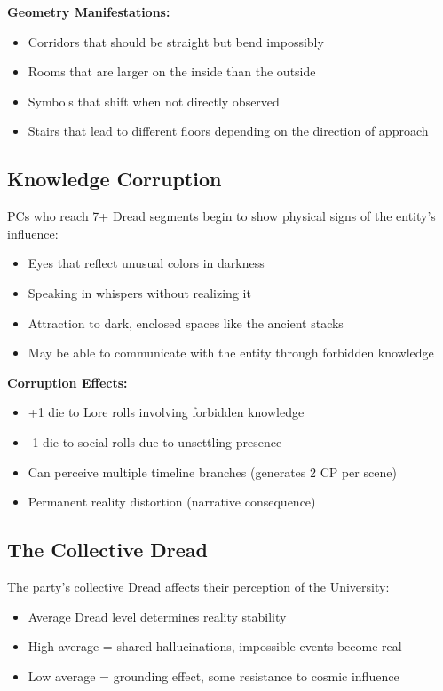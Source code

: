 \documentclass[11pt]{article}
\begin{document}
\textbf{Geometry Manifestations:}
\begin{itemize}
\item Corridors that should be straight but bend impossibly
\item Rooms that are larger on the inside than the outside
\item Symbols that shift when not directly observed
\item Stairs that lead to different floors depending on the direction of approach
\end{itemize}

\subsection{Knowledge Corruption}

PCs who reach 7+ Dread segments begin to show physical signs of the entity's influence:
\begin{itemize}
\item Eyes that reflect unusual colors in darkness
\item Speaking in whispers without realizing it
\item Attraction to dark, enclosed spaces like the ancient stacks
\item May be able to communicate with the entity through forbidden knowledge
\end{itemize}

\textbf{Corruption Effects:}
\begin{itemize}
\item +1 die to Lore rolls involving forbidden knowledge
\item -1 die to social rolls due to unsettling presence
\item Can perceive multiple timeline branches (generates 2 CP per scene)
\item Permanent reality distortion (narrative consequence)
\end{itemize}

\subsection{The Collective Dread}

The party's collective Dread affects their perception of the University:
\begin{itemize}
\item Average Dread level determines reality stability
\item High average = shared hallucinations, impossible events become real
\item Low average = grounding effect, some resistance to cosmic influence
\end{itemize}
\end{document}
